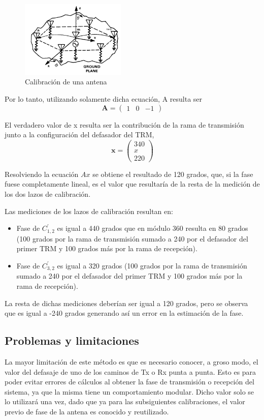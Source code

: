\begin{figure}[H]
 \centering
 \includegraphics[width=5cm]{gfx/mutualRxCal.png}
 \caption{Calibración de una antena}
 \label{fig:phaseDetermination}
\end{figure}

Por lo tanto, utilizando solamente dicha ecuación, A resulta ser
$$
	\mathbf{A} = \begin{pmatrix} 1 & 0 & -1\end{pmatrix}
$$

El verdadero valor de x resulta ser la contribución de la rama de transmisión junto a la configuración del defasador del TRM, 
$$
	\mathbf{x} = \begin{pmatrix} 340 \\ x \\ 220\end{pmatrix}
$$

Resolviendo la ecuación $Ax$ se obtiene el resultado de 120 grados, que, si la fase fuese completamente lineal, es el valor 
que resultaría de la resta de la medición de los dos lazos de calibración.

Las mediciones de los lazos de calibración resultan en:
\begin{itemize}
	\item Fase de $C^{'}_{1,2}$ es igual a 440 grados que en módulo 360 resulta en 80 grados (100 grados por la rama de 
		transmisión sumado a 240 por el defasador del primer TRM y 100 grados más por la rama de recepción).
	\item Fase de $C^{'}_{3, 2}$ es igual a 320 grados (100 grados por la rama de transmisión sumado a 240 por el defasador 
		del primer TRM y 100 grados más por la rama de recepción). 
\end{itemize}

La resta de dichas mediciones deberían ser igual a 120 grados, pero se observa que es igual a -240 grados generando así un 
error en la estimación de la fase.

\subsection{Problemas y limitaciones}

La mayor limitación de este método es que es necesario conocer, a groso modo, el valor del defasaje de uno de los caminos de 
Tx o Rx punta a punta. Esto es para poder evitar errores de cálculos al obtener la fase de transmisión o recepción del 
sistema, ya que la misma tiene un comportamiento modular. Dicho valor solo se lo utilizará una vez, dado que ya para las 
subsiguientes calibraciones, el valor previo de fase de la antena es conocido y reutilizado.

